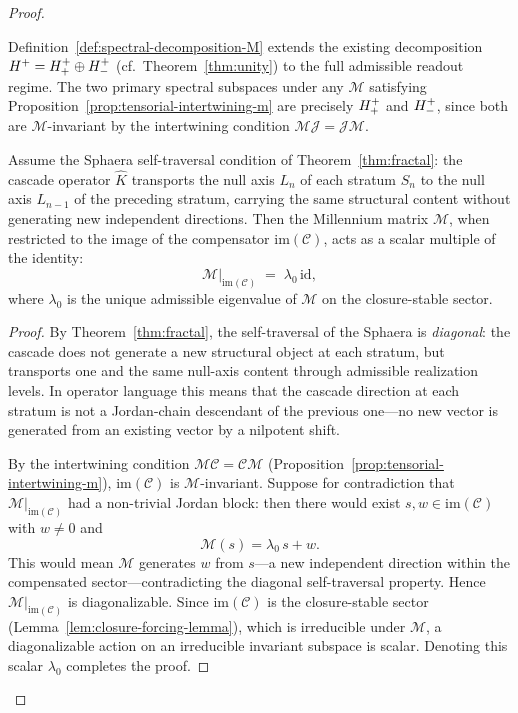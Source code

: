 \begin{proof}
\begin{remark}
Definition~\ref{def:spectral-decomposition-M} extends the existing
decomposition $H^+ = H^+_+ \oplus H^+_-$
(cf.\ Theorem~\ref{thm:unity}) to the full admissible readout regime.
The two primary spectral subspaces under any $\mathcal{M}$ satisfying
Proposition~\ref{prop:tensorial-intertwining-m} are precisely $H^+_+$
and $H^+_-$, since both are $\mathcal{M}$-invariant by the intertwining
condition $\mathcal{M}\mathcal{J} = \mathcal{J}\mathcal{M}$.
\end{remark}

\begin{lemma}
\label{lem:diagonal-traversal-scalar-action}
Assume the Sphaera self-traversal condition of Theorem~\ref{thm:fractal}:
the cascade operator $\hat{K}$ transports the null axis $L_n$ of each
stratum $S_n$ to the null axis $L_{n-1}$ of the preceding stratum,
carrying the same structural content without generating new independent
directions. Then the Millennium matrix $\mathcal{M}$, when restricted to
the image of the compensator $\mathrm{im}(\mathcal{C})$, acts as a scalar
multiple of the identity:
\[
  \mathcal{M}\big|_{\mathrm{im}(\mathcal{C})} \;=\; \lambda_0\,\mathrm{id},
\]
where $\lambda_0$ is the unique admissible eigenvalue of $\mathcal{M}$ on
the closure-stable sector.
\end{lemma}

\begin{proof}
By Theorem~\ref{thm:fractal}, the self-traversal of the Sphaera is
\emph{diagonal}: the cascade does not generate a new structural object at
each stratum, but transports one and the same null-axis content through
admissible realization levels. In operator language this means that the
cascade direction at each stratum is not a Jordan-chain descendant of the
previous one---no new vector is generated from an existing vector by a
nilpotent shift.

By the intertwining condition $\mathcal{M}\mathcal{C} = \mathcal{C}\mathcal{M}$
(Proposition~\ref{prop:tensorial-intertwining-m}), $\mathrm{im}(\mathcal{C})$
is $\mathcal{M}$-invariant. Suppose for contradiction that
$\mathcal{M}|_{\mathrm{im}(\mathcal{C})}$ had a non-trivial Jordan block:
then there would exist $s,w \in \mathrm{im}(\mathcal{C})$ with $w\neq 0$ and
\[
  \mathcal{M}(s) = \lambda_0\,s + w.
\]
This would mean $\mathcal{M}$ generates $w$ from $s$---a new independent
direction within the compensated sector---contradicting the diagonal
self-traversal property. Hence $\mathcal{M}|_{\mathrm{im}(\mathcal{C})}$
is diagonalizable. Since $\mathrm{im}(\mathcal{C})$ is the closure-stable
sector (Lemma~\ref{lem:closure-forcing-lemma}), which is irreducible under
$\mathcal{M}$, a diagonalizable action on an irreducible invariant subspace
is scalar. Denoting this scalar $\lambda_0$ completes the proof.
\end{proof}


\end{proof}
